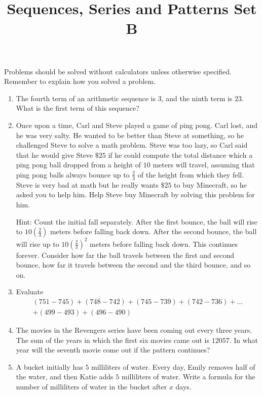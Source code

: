\documentclass{article}
\title{Sequences, Series and Patterns Set B}
\date{}
\author{}
\begin{document}
    \maketitle
    \noindent Problems should be solved without calculators unless otherwise
    specified. Remember to explain how you solved a problem.
    \begin{enumerate}
        \item The fourth term of an arithmetic sequence is $3$, and the ninth
        term is $23$. What is the first term of this sequence?
        \vspace{3cm}
        \item Once upon a time, Carl and Steve played a game of ping pong. Carl
        lost, and he was very salty. He wanted to be better than Steve at
        something, so he challenged Steve to solve a math problem. Steve was too
        lazy, so Carl said that he would give Steve $\$25$ if he could compute
        the total distance which a ping pong ball dropped from a height of $10$
        meters will travel, assuming that ping pong balls always bounce up to
        $\frac{2}{3}$ of the height from which they fell. Steve is very bad at
        math but he really wants $\$25$ to buy Minecraft, so he asked you to
        help him. Help Steve buy Minecraft by solving this problem for him.

        Hint: Count the initial fall separately. After the first bounce, the
        ball will rise to $10\left(\frac{2}{3}\right)$ meters before falling
        back down. After the second bounce, the ball will rise up to
        $10\left(\frac{2}{3}\right)^2$ meters before falling back down. This
        continues forever. Consider how far the ball travels between the first
        and second bounce, how far it travels between the second and the third
        bounce, and so on.
        \vspace{3cm}
        \item Evaluate
        \begin{multline*}
            (751 - 745) + (748 - 742) + (745 - 739) + (742 - 736) + \dots \\
            + (499 - 493) + (496 - 490)
        \end{multline*}
        \vspace{3cm}
        \item The movies in the Revengers series have been coming out every
        three years. The sum of the years in which the first six movies came out
        is $12057$. In what year will the seventh movie come out if the pattern
        continues?
        \vspace{3cm}
        \item A bucket initially has $5$ milliliters of water. Every day, Emily
        removes half of the water, and then Katie adds $5$ milliliters of water.
        Write a formula for the number of milliliters of water in the bucket
        after $x$ days.


\end{enumerate}
\end{document}
